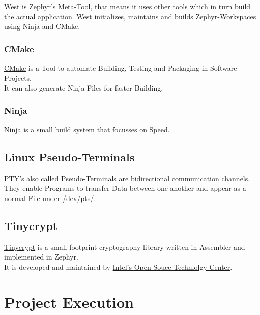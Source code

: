 \href{https://docs.zephyrproject.org/2.4.0/guides/west/index.html}
{West} is Zephyr's Meta-Tool, that means it uses other tools which
in turn build the actual application.
\href{https://docs.zephyrproject.org/2.4.0/guides/west/index.html}
{West} initializes, maintains and builds Zephyr-Workspaces
using
\href{https://ninja-build.org/manual.html}
{Ninja} and
\href{https://cmake.org/}
{CMake}.

\subsubsection{CMake}

\href{https://cmake.org/}
{CMake} is a Tool to automate Building, Testing and Packaging
in Software Projects.
\\
It can also generate Ninja Files for faster Building.

\subsubsection{Ninja}

\href{https://ninja-build.org/manual.html}
{Ninja} is a small build system that focusses on Speed.

\subsection{Linux Pseudo-Terminals}

\href{https://linux.die.net/man/7/pty}
{PTY's} also called
\href{https://linux.die.net/man/7/pty}
{Pseudo-Terminals} are bidirectional communication channels.
They enable Programs to transfer Data between one another
and appear as a normal File under /dev/pts/.

\subsection{Tinycrypt}

\href{https://01.org/tinycrypt}
{Tinycrypt} is a small footprint cryptography library written
in Assembler and implemented in Zephyr.
\\
It is developed and maintained by
\href{https://01.org/}
{Intel's Open Souce Technlolgy Center}.

\pagebreak

\section{Project Execution}

